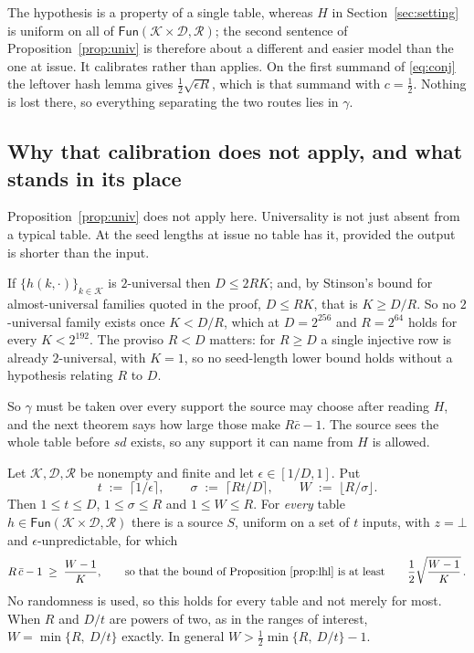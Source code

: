 \documentclass{aicr-solution}
\newcommand{\Fun}{\mathsf{Fun}}
\newcommand{\sd}{\mathit{sd}}
\newcommand{\calK}{\mathcal{K}}
\newcommand{\calD}{\mathcal{D}}
\newcommand{\calR}{\mathcal{R}}
\begin{document}
The hypothesis is a property of a single table, whereas $H$ in Section~\ref{sec:setting} is uniform
on all of $\Fun(\calK\times\calD,\calR)$; the second sentence of Proposition~\ref{prop:univ} is
therefore about a different and easier model than the one at issue. It calibrates rather than
applies. On the first summand of \eqref{eq:conj} the leftover hash lemma gives
$\tfrac12\sqrt{\epsilon R}$, which is that summand with $c = \tfrac12$. Nothing is lost there, so
everything separating the two routes lies in $\gamma$.


\subsection*{Why that calibration does not apply, and what stands in its place}

Proposition~\ref{prop:univ} does not apply here. Universality is not just absent from a typical
table. At the seed lengths at issue no table has it, provided the output is shorter than the
input.

\begin{proposition}\label{prop:nouniv}
If $\{h(k,\cdot)\}_{k\in\calK}$ is $2$-universal then $D \le 2RK$; and, by Stinson's bound for
almost-universal families quoted in the proof, $D \le RK$, that is $K \ge D/R$. So no
$2$-universal family exists once $K < D/R$, which at $D = 2^{256}$ and $R = 2^{64}$ holds for every
$K < 2^{192}$. The proviso $R < D$ matters: for $R \ge D$ a single injective row is already
$2$-universal, with $K = 1$, so no seed-length lower bound holds without a hypothesis relating $R$
to $D$.
\end{proposition}

So $\gamma$ must be taken over every support the source may choose after reading $H$, and the next
theorem says how large those make $R\bar c - 1$. The source sees the whole table before $\sd$
exists, so any support it can name from $H$ is allowed.

\begin{theorem}\label{thm:limit}
Let $\calK, \calD, \calR$ be nonempty and finite and let $\epsilon \in [1/D, 1]$. Put
\[
  t \;:=\; \lceil 1/\epsilon \rceil , \qquad
  \sigma \;:=\; \lceil Rt/D \rceil , \qquad
  W \;:=\; \lfloor R/\sigma \rfloor .
\]
Then $1 \le t \le D$, $1 \le \sigma \le R$ and $1 \le W \le R$. For \emph{every} table
$h \in \Fun(\calK\times\calD,\calR)$ there is a source $S$, uniform on a set of $t$ inputs, with
$z = \bot$ and $\epsilon$-unpredictable, for which
\[
  R\,\bar c - 1 \;\ge\; \frac{W - 1}{K} ,
  \qquad\text{so that the bound of Proposition~\ref{prop:lhl} is at least}\qquad
  \frac12\sqrt{\frac{W-1}{K}} \, .
\]
No randomness is used, so this holds for every table and not merely for most. When $R$ and $D/t$
are powers of two, as in the ranges of interest, $W = \min\{R,\ D/t\}$ exactly. In general
$W > \tfrac12\min\{R,\ D/t\} - 1$.
\end{theorem}
\end{document}
